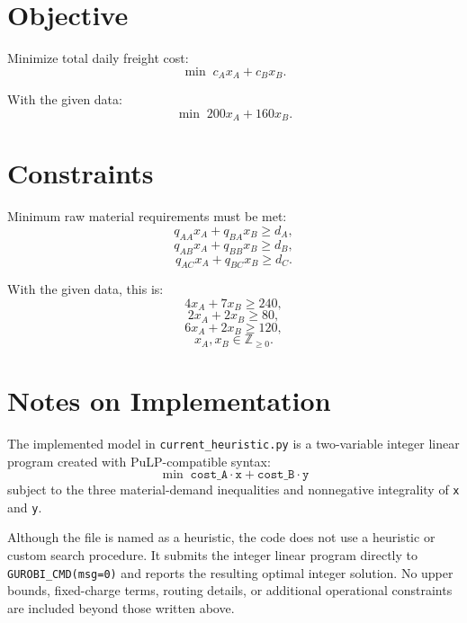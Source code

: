 \section*{Objective}

Minimize total daily freight cost:
\[
\min \; c_A x_A + c_B x_B.
\]

With the given data:
\[
\min \; 200x_A + 160x_B.
\]

\section*{Constraints}

Minimum raw material requirements must be met:
\[
q_{AA}x_A + q_{BA}x_B \ge d_A,
\]
\[
q_{AB}x_A + q_{BB}x_B \ge d_B,
\]
\[
q_{AC}x_A + q_{BC}x_B \ge d_C.
\]

With the given data, this is:
\[
4x_A + 7x_B \ge 240,
\]
\[
2x_A + 2x_B \ge 80,
\]
\[
6x_A + 2x_B \ge 120,
\]
\[
x_A, x_B \in \mathbb{Z}_{\ge 0}.
\]

\section*{Notes on Implementation}

The implemented model in \texttt{current\_heuristic.py} is a two-variable integer linear program created with PuLP-compatible syntax:
\[
\min \; \texttt{cost\_A} \cdot \texttt{x} + \texttt{cost\_B} \cdot \texttt{y}
\]
subject to the three material-demand inequalities and nonnegative integrality of \texttt{x} and \texttt{y}.

Although the file is named as a heuristic, the code does not use a heuristic or custom search procedure. It submits the integer linear program directly to \texttt{GUROBI\_CMD(msg=0)} and reports the resulting optimal integer solution. No upper bounds, fixed-charge terms, routing details, or additional operational constraints are included beyond those written above.
